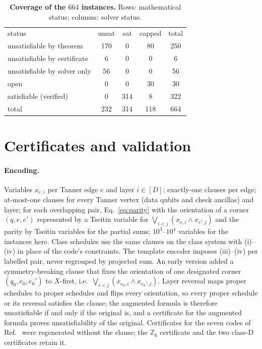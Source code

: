 \documentclass[reprint,twocolumn,superscriptaddress,nofootinbib]{revtex4-2}
\theoremstyle{plain}
\begin{document}
\begin{table}[!htbp]
\caption{\textbf{Coverage of the $664$ instances.} Rows: mathematical
status; columns: solver status.}
\label{tab:coverage}
\begin{ruledtabular}
\begin{tabular}{lcccc}
status & unsat & sat & capped & total \\
\colrule
unsatisfiable by theorem      & 170 & 0   & 80  & 250 \\
unsatisfiable by certificate  & 6   & 0   & 0   & 6   \\
unsatisfiable by solver only  & 56  & 0   & 0   & 56  \\
open                          & 0   & 0   & 30  & 30  \\
satisfiable (verified)        & 0   & 314 & 8   & 322 \\
\colrule
total                         & 232 & 314 & 118 & 664 \\
\end{tabular}
\end{ruledtabular}
\end{table}

\section{Certificates and validation}
\label{si:certs}

\paragraph*{Encoding.}
Variables $x_{e,i}$ per Tanner edge $e$ and layer $i\in[D]$; exactly-one
clauses per edge; at-most-one clauses for every Tanner vertex (data qubits
and check ancillas) and layer; for each overlapping pair,
Eq.~\eqref{eq:parity} with the orientation of a corner $(q,e,e')$
represented by a Tseitin variable for
$\bigvee_{i<j}(x_{e,i}\wedge x_{e',j})$ and the parity by Tseitin variables
for the partial sums; $10^3$--$10^4$ variables for the instances here.
Class schedules use the same clauses on the class system with (i)--(iv)
in place of the code's constraints. The template encoder imposes
(iii)--(iv) per labelled pair, never regrouped by projected sum. An early
version added a symmetry-breaking clause that fixes the orientation of one
designated corner $(q_0,e_0,e_0')$ to $X$-first, i.e.\
$\bigvee_{i<j}(x_{e_0,i}\wedge x_{e_0',j})$. Layer reversal maps proper
schedules to proper schedules and flips every orientation, so every proper
schedule or its reversal satisfies the clause; the augmented formula is
therefore unsatisfiable if and only if the original is, and a certificate
for the augmented formula proves unsatisfiability of the original.
Certificates for the seven codes of Ref.~\cite{Bravyi2024} were
regenerated without the clause; the $\mathbb{Z}_6$ certificate and the two
class-D certificates retain it.
\end{document}
